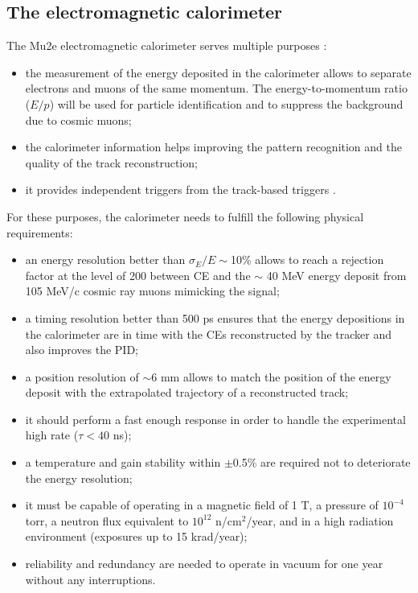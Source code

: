 \subsection{The electromagnetic calorimeter}\label{calorimeter}
The Mu2e electromagnetic calorimeter serves multiple purposes \cite{em4}:
\begin{itemize}
    \item the measurement of the energy deposited in the calorimeter 
    allows to separate electrons and muons of the same momentum. 
    The energy-to-momentum ratio ($E/p$) will be used for particle 
    identification and to suppress the background due to cosmic muons;
  \item the calorimeter information 
    helps improving the pattern recognition and 
    the quality of the track reconstruction;
    \item it provides independent triggers from the track-based triggers \cite{em6}. 
\end{itemize} 
For these purposes, the calorimeter needs to fulfill the following physical requirements:
\begin{itemize}
    \item an energy resolution better than $\sigma_E/E \sim$10\% allows
     to reach a rejection factor at the level of 200 between CE
    and the $\sim$ 40 MeV energy deposit from 105 MeV/c cosmic ray muons mimicking the signal;
    \item a timing resolution better than 500 ps ensures that
    the energy depositions in the calorimeter are in time with
    the CEs reconstructed by the tracker and
    also improves the PID;
    \item a position resolution of $\sim$6 mm allows 
    to match the position of the energy deposit with the 
    extrapolated trajectory of a reconstructed track;
    \item it should perform a fast enough 
      response in order to handle the experimental high rate ($\tau < 40$ ns);
    \item a temperature and gain stability within $\pm$0.5\% 
    are required not to deteriorate the energy resolution;
    \item it must be capable of operating in 
    a magnetic field of 1 T, a pressure of \(10^{-4}\) torr, a 
    neutron flux equivalent to \(10^{12}\) n/cm\(^2\)/year, 
    and in a high radiation environment (exposures up to 15 krad/year);
    \item reliability and redundancy are needed to operate in vacuum for one
    year without any interruptions.
\end{itemize}


